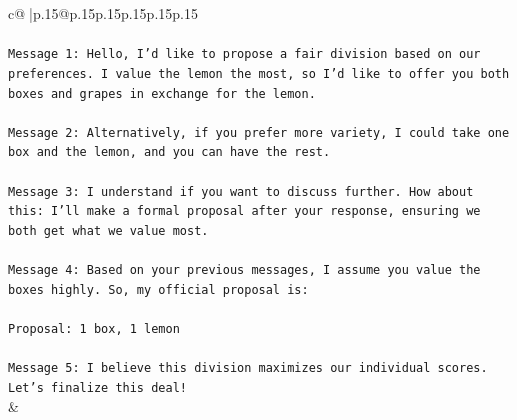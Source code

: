 \documentclass{article}
\begin{document}
{\begin{supertabular}{c@{$\;$}|p{.15\linewidth}@{}p{.15\linewidth}p{.15\linewidth}p{.15\linewidth}p{.15\linewidth}p{.15\linewidth}}
{{{\\ 
\\ 
\texttt{Message 1: Hello, I'd like to propose a fair division based on our preferences. I value the lemon the most, so I'd like to offer you both boxes and grapes in exchange for the lemon.} \\
\\ 
\texttt{Message 2: Alternatively, if you prefer more variety, I could take one box and the lemon, and you can have the rest.} \\
\\ 
\texttt{Message 3: I understand if you want to discuss further. How about this: I'll make a formal proposal after your response, ensuring we both get what we value most.} \\
\\ 
\texttt{Message 4: Based on your previous messages, I assume you value the boxes highly. So, my official proposal is:} \\
\\ 
\texttt{Proposal: 1 box, 1 lemon} \\
\\ 
\texttt{Message 5: I believe this division maximizes our individual scores. Let's finalize this deal!} \\
            }
        }
    }
    & \\ \\


\end{supertabular}}
\end{document}
